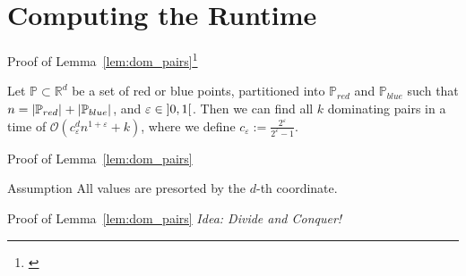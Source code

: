 \section{Computing the Runtime}

\begin{frame}{Proof of Lemma~\ref{lem:dom_pairs}\footnote[1]{\cite[Lemma~2.1]{Chan2007}}}
    \setcounter{theorem}{0}
    \begin{lemma}
        Let $\mathbb{P} \subset \mathbb{R}^d$ be a set of red or blue points, partitioned into $\mathbb{P}_{red}$ and $\mathbb{P}_{blue}$ such that $n = \left\lvert\mathbb{P}_{red}\right\rvert_{} + \left\lvert\mathbb{P}_{blue}\right\rvert_{}$, and $\varepsilon \in \interval[open]{0}{1}$.
        Then we can find all $k$ dominating pairs in a time of $\mathcal{O}\left( c_\varepsilon^d n^{1 + \varepsilon} + k \right)$, where we define $c_\varepsilon := \frac{2^\varepsilon}{2^\varepsilon - 1}$.
    \end{lemma}
\end{frame}

\begin{frame}{Proof of Lemma~\ref{lem:dom_pairs}}
    \begin{exampleblock}{Assumption}
        All values are presorted by the $d$-th coordinate.
    \end{exampleblock}
\end{frame}

\begin{frame}{Proof of Lemma~\ref{lem:dom_pairs}}
    \emph{Idea: Divide and Conquer!}
    
\end{frame}

